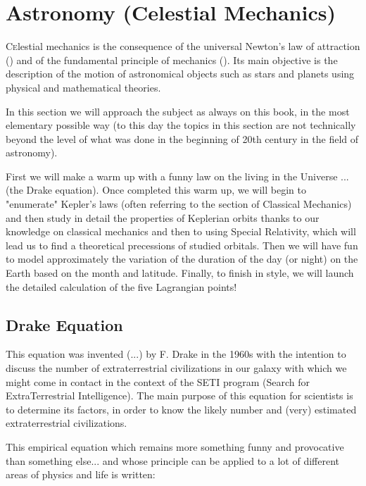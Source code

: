 	\newpage
	\thispagestyle{empty}
	\mbox{}
	\section{Astronomy (Celestial Mechanics)}\label{astronomy}
	\lettrine[lines=4]{\color{BrickRed}C}elestial mechanics is the consequence of the universal Newton's law of attraction () and of the fundamental principle of mechanics (). Its main objective is the description of the motion of astronomical objects such as stars and planets using physical and mathematical theories.
	
	In this section we will approach the subject as always on this book, in the most elementary  possible way (to this day the topics in this section are not technically beyond the level of what was done in the beginning of 20th century in the field of astronomy).
	
	First we will make a warm up with a funny law on the living in the Universe ... (the Drake equation). Once completed this warm up, we will begin to "enumerate" Kepler's laws (often referring to the section of Classical Mechanics) and then study in detail the properties of Keplerian orbits thanks to our knowledge on classical mechanics and then to using Special Relativity, which will lead us to find a theoretical precessions of studied orbitals. Then we will have fun to model approximately the variation of the duration of the day (or night) on the Earth based on the month and latitude. Finally, to finish in style, we will launch the detailed calculation of the five Lagrangian points!
	
	\subsection{Drake Equation}
	This equation was invented (...) by F. Drake in the 1960s with the intention to discuss the number of extraterrestrial civilizations in our galaxy with which we might come in contact in the context of the SETI program (Search for ExtraTerrestrial Intelligence). The main purpose of this equation for scientists is to determine its factors, in order to know the likely number and (very) estimated extraterrestrial civilizations.
	
	This empirical equation which remains more something funny and provocative than something else... and  whose principle can be applied to a lot of different areas of physics and life is written:
	
